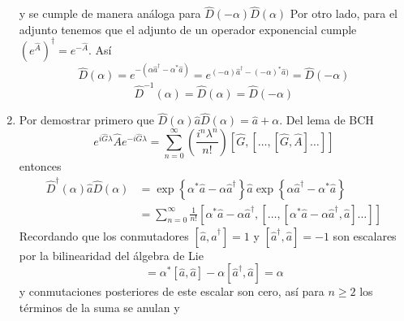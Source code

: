 \begin{enumerate}
y se cumple de manera análoga para $\hat{D}(-\alpha)\hat{D}(\alpha)$
Por otro lado, para el adjunto tenemos que el adjunto de un operador exponencial cumple $\left(e^{\hat{A}}\right)^{\dagger} = e^{-\hat{A}}$. Así
\begin{equation*}
\hat{D}(\alpha) = e^{-(\alpha \hat{a}^{\dagger} - \alpha^{*}\hat{a})} = e^{(-\alpha) \hat{a}^{\dagger} - (-\alpha)^{*}\hat{a})} = \hat{D}(-\alpha)
\end{equation*}
\begin{equation*}
\hat{D}^{-1}(\alpha) = \hat{D}(\alpha) = \hat{D}(-\alpha)
\end{equation*}
\item Por demostrar primero que $\hat{D}(\alpha)\hat{a}\hat{D}(\alpha) = \hat{a} + \alpha$. Del lema de BCH \cite{Sakurai}
\begin{equation*}
e^{i\hat{G}\lambda}\hat{A}e^{-i\hat{G}\lambda} = \sum_{n=0}^{\infty} \left( \frac{i^n \lambda^n}{n!} \right)[\hat{G},[\dots, [\hat{G},\hat{A}]\dots]]
\end{equation*}
entonces
\begin{align*}
\hat{D}^{\dagger}(\alpha) \hat{a} \hat{D}(\alpha) & = \exp{\left\{ \alpha^{*}\hat{a} - \alpha \hat{a}^{\dagger} \right\}} \hat{a} \exp{\left\{ \alpha\hat{a}^{\dagger} - \alpha^{*}\hat{a} \right\}}      \\
& = \sum_{n=0}^{\infty} \frac{1}{n!}[\alpha^{*}\hat{a} -\alpha \hat{a}^{\dagger}, [\dots,[\alpha^{*}\hat{a} - \alpha \hat{a}^{\dagger}, \hat{a}]\dots]]
\end{align*}
Recordando que los conmutadores $[\hat{a}, \hat{a}^{\dagger}] = 1$ y $[\hat{a}^{\dagger}, \hat{a}] = -1$ son escalares
por la bilinearidad del álgebra de Lie
\begin{equation*}
[\alpha^{*}\hat{a} - \alpha\hat{a}^{\dagger},\hat{a}] = \alpha^{*}[\hat{a}, \hat{a}] - \alpha[\hat{a}^{\dagger}, \hat{a}] = \alpha
\end{equation*}
y conmutaciones posteriores de este escalar son cero, así para $n\geq 2$ los términos de la suma se anulan y


\end{enumerate}
